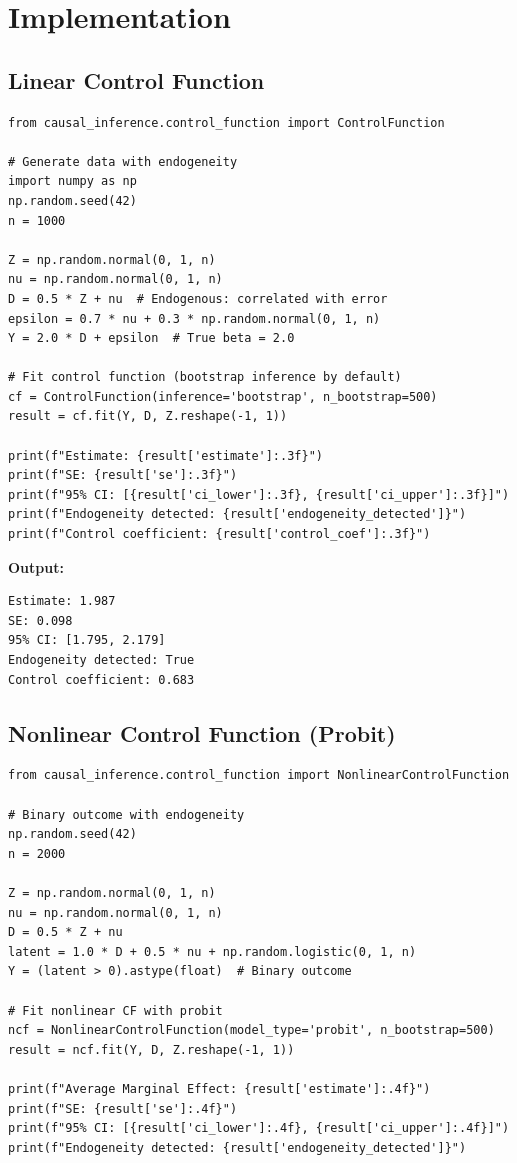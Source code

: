 \section{Implementation}
\label{sec:cf_implementation}

\subsection{Linear Control Function}

\begin{verbatim}
from causal_inference.control_function import ControlFunction

# Generate data with endogeneity
import numpy as np
np.random.seed(42)
n = 1000

Z = np.random.normal(0, 1, n)
nu = np.random.normal(0, 1, n)
D = 0.5 * Z + nu  # Endogenous: correlated with error
epsilon = 0.7 * nu + 0.3 * np.random.normal(0, 1, n)
Y = 2.0 * D + epsilon  # True beta = 2.0

# Fit control function (bootstrap inference by default)
cf = ControlFunction(inference='bootstrap', n_bootstrap=500)
result = cf.fit(Y, D, Z.reshape(-1, 1))

print(f"Estimate: {result['estimate']:.3f}")
print(f"SE: {result['se']:.3f}")
print(f"95% CI: [{result['ci_lower']:.3f}, {result['ci_upper']:.3f}]")
print(f"Endogeneity detected: {result['endogeneity_detected']}")
print(f"Control coefficient: {result['control_coef']:.3f}")
\end{verbatim}

\textbf{Output:}
\begin{verbatim}
Estimate: 1.987
SE: 0.098
95% CI: [1.795, 2.179]
Endogeneity detected: True
Control coefficient: 0.683
\end{verbatim}

\subsection{Nonlinear Control Function (Probit)}

\begin{verbatim}
from causal_inference.control_function import NonlinearControlFunction

# Binary outcome with endogeneity
np.random.seed(42)
n = 2000

Z = np.random.normal(0, 1, n)
nu = np.random.normal(0, 1, n)
D = 0.5 * Z + nu
latent = 1.0 * D + 0.5 * nu + np.random.logistic(0, 1, n)
Y = (latent > 0).astype(float)  # Binary outcome

# Fit nonlinear CF with probit
ncf = NonlinearControlFunction(model_type='probit', n_bootstrap=500)
result = ncf.fit(Y, D, Z.reshape(-1, 1))

print(f"Average Marginal Effect: {result['estimate']:.4f}")
print(f"SE: {result['se']:.4f}")
print(f"95% CI: [{result['ci_lower']:.4f}, {result['ci_upper']:.4f}]")
print(f"Endogeneity detected: {result['endogeneity_detected']}")
\end{verbatim}

